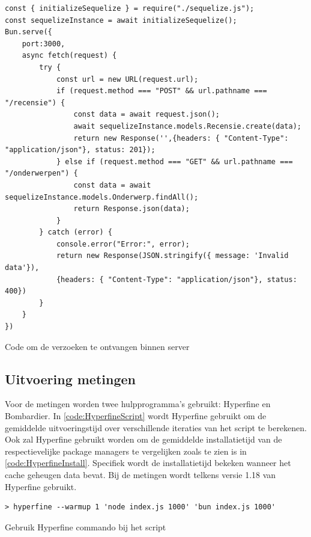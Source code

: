 \begin{listing}[H]
  \centering
  \begin{verbatim}
const { initializeSequelize } = require("./sequelize.js");
const sequelizeInstance = await initializeSequelize();
Bun.serve({
    port:3000,
    async fetch(request) {
        try {
            const url = new URL(request.url);
            if (request.method === "POST" && url.pathname === "/recensie") {
                const data = await request.json();
                await sequelizeInstance.models.Recensie.create(data);
                return new Response('',{headers: { "Content-Type": "application/json"}, status: 201});
            } else if (request.method === "GET" && url.pathname === "/onderwerpen") {
                const data = await sequelizeInstance.models.Onderwerp.findAll();
                return Response.json(data);
            }
        } catch (error) {
            console.error("Error:", error);
            return new Response(JSON.stringify({ message: 'Invalid data'}), 
            {headers: { "Content-Type": "application/json"}, status: 400})
        }
    }
})
\end{verbatim}
\caption{\label{code:BunServer}Code om de verzoeken te ontvangen binnen server}
\end{listing}
\subsection{Uitvoering metingen}
Voor de metingen worden twee hulpprogramma's gebruikt: Hyperfine en Bombardier.
In \ref{code:HyperfineScript} wordt Hyperfine gebruikt om de gemiddelde uitvoeringstijd over verschillende iteraties van het script te berekenen.
Ook zal Hyperfine gebruikt worden om de gemiddelde installatietijd van de respectievelijke package managers te vergelijken zoals 
te zien is in \ref{code:HyperfineInstall}. Specifiek wordt de installatietijd bekeken wanneer het cache geheugen data bevat.
Bij de metingen wordt telkens versie 1.18 van Hyperfine gebruikt.
\begin{listing}[H]
  \centering
  \begin{verbatim}
> hyperfine --warmup 1 'node index.js 1000' 'bun index.js 1000'
      \end{verbatim}
      \caption{\label{code:HyperfineScript}Gebruik Hyperfine commando bij het script}
\end{listing}

